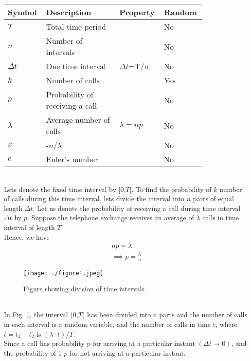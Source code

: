 \documentclass[journal,12pt,twocolumn]{IEEEtran}
\begin{document}
\begin{table}[h!]
\centering
    \begin{tabular}{|p{0.14\linewidth}|p{0.35\linewidth}|p{0.16\linewidth}|p{0.16\linewidth}|}
    \hline
    \textbf{Symbol} & \textbf{Description} & \textbf{Property} & \textbf{Random}\\[0.5ex]
    \hline
    $T$ & Total time period &  &No\\
    \hline
    $n$ & Number of intervals &  &No\\
    \hline
    $\Delta t$ & One time interval & $\Delta t$=T/n & No\\
    \hline
    $k$ & Number of calls & & Yes\\
    \hline
    $p$ & Probability of receiving a call & &No\\
    \hline
    $\lambda$ & Average number of calls & $\lambda=np$ &No\\
    \hline
    $x$ & -$n$/$\lambda$ & &No\\
    \hline
    $e$ & Euler's number & &No\\
    \hline
    \end{tabular}
\end{table}\\
Lets denote the fixed time interval by [0,$T$].
To find the probability of $k$ number of calls during this time interval, lets divide the interval into $n$ parts of equal length $\Delta t$.
Let us denote the probability of receiving a call during time interval $\Delta t$ by $p$. Suppose the telephone exchange receives an average of $\lambda$ calls in time interval of length $T$.\\
Hence, we have
\begin{align}
    np=\lambda\\
    \implies p=\frac{\lambda}{n}
\end{align}
\begin{figure}[!hbt]
    \centering
	\texttt{[image: ./figure1.jpeg]}
    \caption{Figure showing division of time intervals.}
    \label{fig_0}
\end{figure}\\
In Fig. \ref{fig_0}, the interval (0,$T$) has been divided into n parts and the number of calls in each interval is a random variable, and the number of calls in time t, where $t=t_4-t_2$ is $(\lambda\cdot t)/T$.\\

Since a call has probability p for arriving at a particular instant $(\Delta t\rightarrow 0)$, and the probability of 1-$p$ for not arriving at a particular instant.\\
\end{document}
